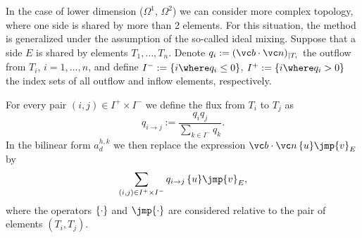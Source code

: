 
In the case of lower dimension ($\Omega^1$, $\Omega^2$) we can consider more complex topology,
 where one side is shared by more than 2 elements.
For this situation, the method is generalized under the assumption of the so-called ideal mixing.
Suppose that a side $E$ is shared by elements $T_1,\ldots,T_n$.
Denote $q_i:=(\vc b\cdot\vc n)_{|T_i}$ the outflow from $T_i$, $i=1,\ldots,n$,
 and define $I^-:=\{i\where q_i\le 0\}$, $I^+:=\{i\where q_i>0\}$
 the index sets of all outflow and inflow elements, respectively.

For every pair $(i,j)\in I^+\times I^-$ we define the flux from $T_i$ to $T_j$ as
$$ q_{i\to j} := \frac{q_i q_j}{\sum_{k\in I^-}{q_k}}.$$
In the bilinear form $a_d^{h,k}$ we then replace the expression $\sc{\vc b\cdot\vc n\avg{u}}{\jmp{v}}_E$ by
$$ \sum_{(i,j)\in I^+\times I^-}\sc{q_{i\to j}\avg{u}}{\jmp{v}}_E, $$
where the operators $\left\{\cdot\right\}$ and $\jmp{\cdot}$ are considered relative to the pair of elements $(T_i,T_j)$.
